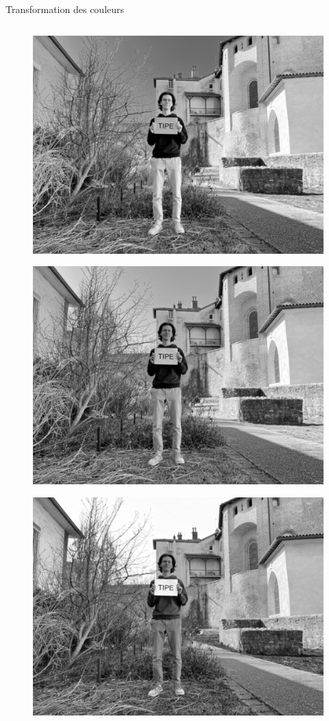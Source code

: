 \documentclass[xcolor=dvipsnames]{beamer}
\begin{document}
\begin{frame}{Transformation des couleurs}
\begin{columns}
        \begin{column}{0.3\textwidth}
            \vspace{-15pt}
            \begin{figure}
                \centering
                \includegraphics[width=0.8\linewidth]{rouge.jpg}
            \end{figure}
            \vspace{-15pt}
            \begin{figure}
                \centering
                \includegraphics[width=.8\linewidth]{vert.jpg}
            \end{figure}
            \vspace{-15pt}
            \begin{figure}
                \centering
                \includegraphics[width=.8\linewidth]{bleu.jpg}

\end{figure}
\end{column}
\end{columns}
\end{frame}
\end{document}
